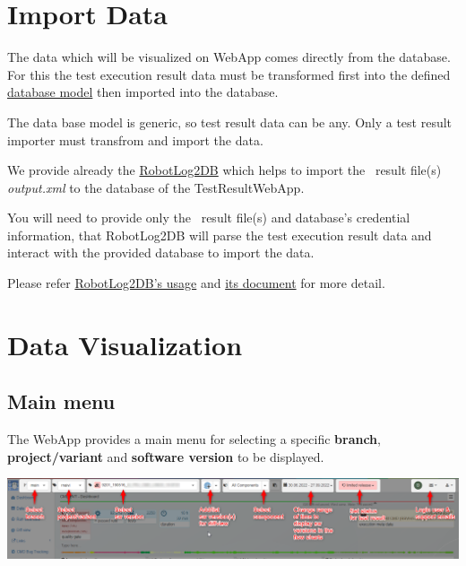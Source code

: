 \hypertarget{import-data}{%
\section{Import Data}\label{import-data}}

The data which will be visualized on WebApp comes directly from the database.
For this the test execution result data must be transformed first
into the defined \href{https://github.com/test-fullautomation/testresultwebapp/blob/develop/TestResultWebApp/mysql_server/datamodel/datamodel.svg}{database model}
then imported into the database.

The data base model is generic, so test result data can be any. Only a test
result importer must transfrom and import the data.

We provide already the \href{https://github.com/test-fullautomation/robotframework-robotlog2db}{RobotLog2DB}
which helps to import the \rfwcore\ result file(s) \emph{output.xml} to the
database of the TestResultWebApp.

You will need to provide only the \rfwcore\ result file(s) and database's
credential information, that RobotLog2DB will parse the test execution result data
and interact with the provided database to import the data.

Please refer \href{https://github.com/test-fullautomation/robotframework-robotlog2db#usage}{RobotLog2DB's usage} and
\href{https://github.com/test-fullautomation/robotframework-robotlog2db/blob/develop/RobotLog2DB/RobotLog2DB.pdf}
{its document} for more detail.


\hypertarget{data-visualization}{%
\section{Data Visualization}\label{data-visualization}}

\hypertarget{main-menu}{%
\subsection{Main menu}\label{main-menu}}
The WebApp provides a main menu for selecting a specific \textbf{branch},
\textbf{project/variant} and \textbf{software version} to be displayed.

\includegraphics[width=1\linewidth]{./pictures/main-menu.png}

